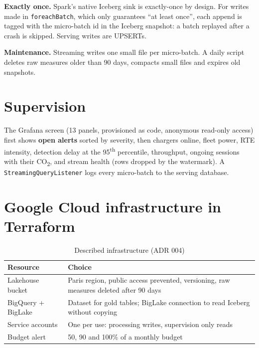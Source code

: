 \documentclass[11pt, a4paper, oneside, headings=normal, numbers=noenddot, DIV=12]{scrartcl}
\begin{document}
\textbf{Exactly once.} Spark's native Iceberg sink is exactly-once by design. For writes made in \texttt{foreachBatch}, which only guarantees
``at least once'', each append is tagged with the micro-batch id in the Iceberg snapshot: a batch replayed after a crash is skipped. Serving writes
are UPSERTs.

\textbf{Maintenance.} Streaming writes one small file per micro-batch. A daily script deletes raw measures older than 90 days, compacts small files
and expires old snapshots.

\section{Supervision}

The Grafana screen (13 panels, provisioned as code, anonymous read-only access) first shows \textbf{open alerts} sorted by severity, then chargers
online, fleet power, RTE intensity, detection delay at the 95\textsuperscript{th} percentile, throughput, ongoing sessions with their
CO\textsubscript{2}, and stream health (rows dropped by the watermark). A \texttt{StreamingQueryListener} logs every micro-batch to the serving database.

\section{Google Cloud infrastructure in Terraform}

\begin{table}[H]
\centering\small
\begin{tabularx}{\linewidth}{@{}L{4.2cm} Y@{}}
\toprule
\textbf{Resource} & \textbf{Choice} \\
\midrule
Lakehouse bucket & Paris region, public access prevented, versioning, raw measures deleted after 90 days \\
BigQuery + BigLake & Dataset for gold tables; BigLake connection to read Iceberg without copying \\
Service accounts & One per use: processing writes, supervision only reads \\
Budget alert & 50, 90 and 100\% of a monthly budget \\
\bottomrule
\end{tabularx}
\caption{Described infrastructure (ADR 004)}
\end{table}
\end{document}
